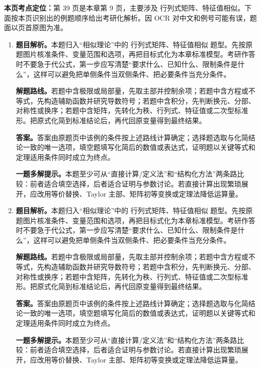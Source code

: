 \begin{solutionblock}
\textbf{本页考点定位：}第 39 页是本章第 9 页，主要涉及 行列式矩阵、特征值相似。下面按本页识别出的例题顺序给出考研化解析。因 OCR 对中文和例号可能有误，题面以页首原图为准。

\begin{enumerate}[label=\textbf{例\arabic*.}, leftmargin=2.4em]

\item \textbf{题目解析。}本题归入“相似理论”中的 行列式矩阵、特征值相似 题型。先按原题图片核准条件、变量范围和选项，再把目标式化为本章标准模型。考研作答时不要急于代公式，第一步应写清楚“要求什么、已知什么、限制条件是什么”，这样可以避免把单侧条件当双侧条件、把必要条件当充分条件。

\textbf{解题路线。}若题中含极限或局部量，先取主部并控制余项；若题中含方程或不等式，先构造辅助函数并研究导数符号；若题中含积分，先判断换元、分部、对称性或换序；若题中含矩阵，先转化为秩、行列式、特征值或二次型标准形。把原式化简到标准结论后，再代回原变量得到最终结果。

\textbf{答案。}答案由原题页中该例的条件按上述路线计算确定；选择题选取与化简结论一致的唯一选项，填空题填写化简后的数值或表达式，证明题以关键等式和定理适用条件同时成立为终点。

\textbf{一题多解提示。}本题至少可从“直接计算/定义法”和“结构化方法”两条路比较：前者适合填空选择，后者适合证明与参数讨论。若直接计算出现繁琐展开，应改用等价替换、Taylor 主部、矩阵初等变换或定理法降低运算量。

\item \textbf{题目解析。}本题归入“相似理论”中的 行列式矩阵、特征值相似 题型。先按原题图片核准条件、变量范围和选项，再把目标式化为本章标准模型。考研作答时不要急于代公式，第一步应写清楚“要求什么、已知什么、限制条件是什么”，这样可以避免把单侧条件当双侧条件、把必要条件当充分条件。

\textbf{解题路线。}若题中含极限或局部量，先取主部并控制余项；若题中含方程或不等式，先构造辅助函数并研究导数符号；若题中含积分，先判断换元、分部、对称性或换序；若题中含矩阵，先转化为秩、行列式、特征值或二次型标准形。把原式化简到标准结论后，再代回原变量得到最终结果。

\textbf{答案。}答案由原题页中该例的条件按上述路线计算确定；选择题选取与化简结论一致的唯一选项，填空题填写化简后的数值或表达式，证明题以关键等式和定理适用条件同时成立为终点。

\textbf{一题多解提示。}本题至少可从“直接计算/定义法”和“结构化方法”两条路比较：前者适合填空选择，后者适合证明与参数讨论。若直接计算出现繁琐展开，应改用等价替换、Taylor 主部、矩阵初等变换或定理法降低运算量。

\end{enumerate}
\end{solutionblock}



